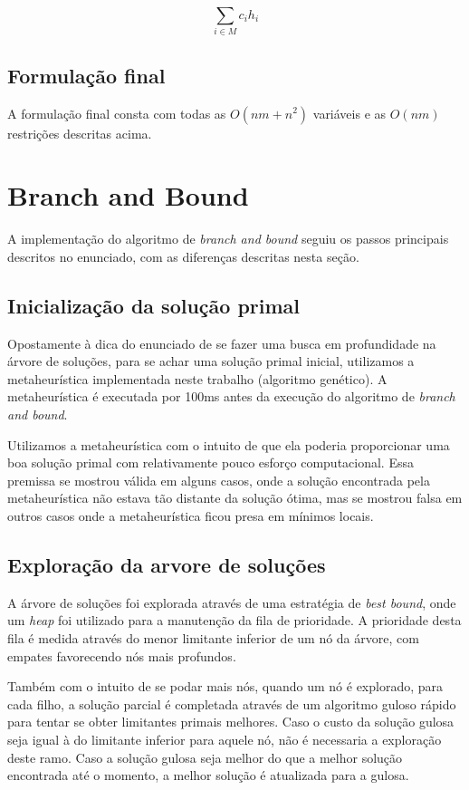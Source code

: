 \documentclass[a4paper,11pt]{article}
\begin{document}
\begin{equation}
  \sum_{i \in M} c_i h_i
\end{equation}

\subsection{Formulação final}
A formulação final consta com todas as $O(nm + n^2)$ variáveis e as $O(nm)$
restrições descritas acima.

\section{Branch and Bound}
A implementação do algoritmo de \textit{branch and bound} seguiu os passos principais
descritos no enunciado, com as diferenças descritas nesta seção.

\subsection{Inicialização da solução primal}
Opostamente à dica do enunciado de se fazer uma busca em profundidade na árvore
de soluções, para se achar uma solução primal inicial, utilizamos a metaheurística
implementada neste trabalho (algoritmo genético). A metaheurística é executada
por 100ms antes da execução do algoritmo de \textit{branch and bound}.

Utilizamos a metaheurística com o intuito de que ela poderia proporcionar uma
boa solução primal com relativamente pouco esforço computacional. Essa premissa
se mostrou válida em alguns casos, onde a solução encontrada pela metaheurística
não estava tão distante da solução ótima, mas se mostrou falsa em outros casos
onde a metaheurística ficou presa em mínimos locais.

\subsection{Exploração da arvore de soluções}
A árvore de soluções foi explorada através de uma estratégia de \textit{best bound},
onde um \textit{heap} foi utilizado para a manutenção da fila de prioridade. A prioridade
desta fila é medida através do menor limitante inferior de um nó da árvore, com empates favorecendo
nós mais profundos.

Também com o intuito de se podar mais nós, quando um nó é explorado, para cada filho,
a solução parcial é completada através de um algoritmo guloso rápido para tentar se obter
limitantes primais melhores. Caso o custo da solução gulosa seja igual à do limitante
inferior para aquele nó, não é necessaria a exploração deste ramo. Caso a solução gulosa seja melhor
do que a melhor solução encontrada até o momento, a melhor solução é atualizada
para a gulosa.
\end{document}
